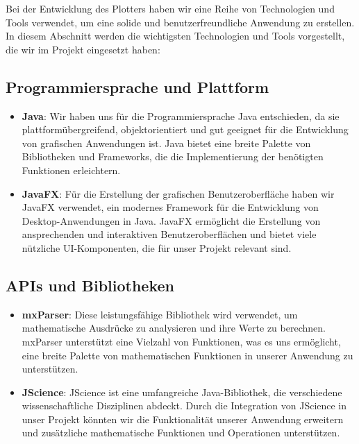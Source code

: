 \documentclass[a4paper]{article}
\begin{document}
Bei der Entwicklung des Plotters haben wir eine Reihe von Technologien und Tools verwendet, um eine solide und benutzerfreundliche Anwendung zu erstellen. In diesem Abschnitt werden die wichtigsten Technologien und Tools vorgestellt, die wir im Projekt eingesetzt haben:

\subsection{Programmiersprache und Plattform}

\begin{itemize}
\item \textbf{Java}: Wir haben uns für die Programmiersprache Java entschieden, da sie plattformübergreifend, objektorientiert und gut geeignet für die Entwicklung von grafischen Anwendungen ist. Java bietet eine breite Palette von Bibliotheken und Frameworks, die die Implementierung der benötigten Funktionen erleichtern.

\item \textbf{JavaFX}: Für die Erstellung der grafischen Benutzeroberfläche haben wir JavaFX verwendet, ein modernes Framework für die Entwicklung von Desktop-Anwendungen in Java. JavaFX ermöglicht die Erstellung von ansprechenden und interaktiven Benutzeroberflächen und bietet viele nützliche UI-Komponenten, die für unser Projekt relevant sind.
\end{itemize}

\subsection{APIs und Bibliotheken}

\begin{itemize}
\item \textbf{mxParser}: Diese leistungsfähige Bibliothek wird verwendet, um mathematische Ausdrücke zu analysieren und ihre Werte zu berechnen. mxParser unterstützt eine Vielzahl von Funktionen, was es uns ermöglicht, eine breite Palette von mathematischen Funktionen in unserer Anwendung zu unterstützen.

\item \textbf{JScience}: JScience ist eine umfangreiche Java-Bibliothek, die verschiedene wissenschaftliche Disziplinen abdeckt. Durch die Integration von JScience in unser Projekt könnten wir die Funktionalität unserer Anwendung erweitern und zusätzliche mathematische Funktionen und Operationen unterstützen.
\end{itemize}
\end{document}
